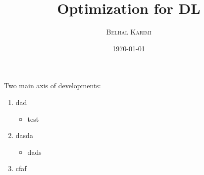 \documentclass[11pt]{article}
\title{Optimization for DL}
\author{%
\textsc{Belhal Karimi}\\
}
\date{\today} %
\theoremstyle{plain}
\theoremstyle{plain}
\theoremstyle{definition}
\begin{document}
\maketitle


Two main axis of developments:
\begin{enumerate}
\item dad
\begin{itemize}
\item test
\end{itemize}
\item dasda
\begin{itemize}
\item dads
\end{itemize}
\item cfaf
\end{enumerate}





%
\newpage
\end{document}
